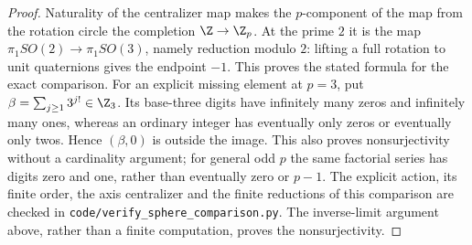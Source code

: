 \begin{proof}
Naturality of the centralizer map makes the $p$-component of the map
from the rotation circle the completion $\Z\to\Z_p$. At the prime
$2$ it is the map $\pi_1SO(2)\to\pi_1SO(3)$, namely reduction modulo
$2$: lifting a full rotation to unit quaternions gives the endpoint
$-1$. This proves the stated formula for the exact comparison.
For an explicit missing element at $p=3$, put
$\beta=\sum_{j\ge1}3^{j!}\in\Z_3$. Its base-three digits have
infinitely many zeros and infinitely many ones, whereas an ordinary
integer has eventually only zeros or eventually only twos. Hence
$(\beta,0)$ is outside the image. This also proves nonsurjectivity
without a cardinality argument; for general odd $p$ the same factorial
series has digits zero and one, rather than eventually zero or $p-1$. The explicit action, its finite order, the axis
centralizer and the finite reductions of this comparison are checked in
\texttt{code/verify\_sphere\_comparison.py}. The inverse-limit argument
above, rather than a finite computation, proves the nonsurjectivity.
\end{proof}

